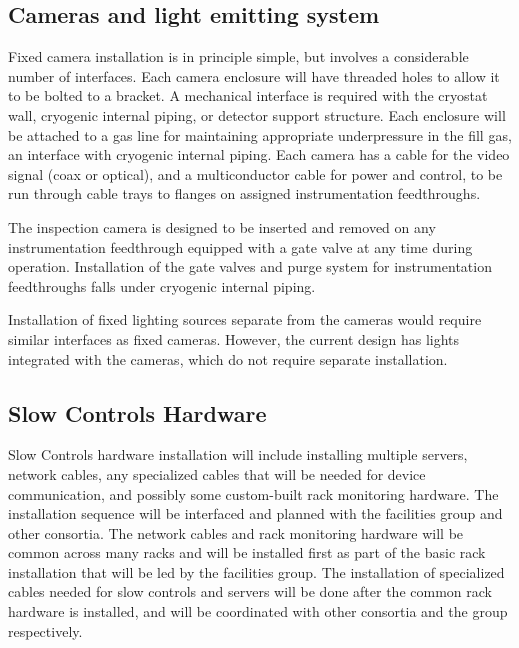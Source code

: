 \subsection{Cameras and light emitting system}
\label{sec:fdgen-slow-cryo-install-c}

Fixed camera installation is in principle simple, but involves a
considerable number of interfaces. Each camera enclosure will have
threaded holes to allow it to be bolted to a bracket. A mechanical
interface is required with the cryostat wall, cryogenic internal
piping, or detector support structure. Each enclosure will be attached
to a gas line for maintaining appropriate underpressure in the fill
gas, an interface with cryogenic internal piping. Each camera has a
cable for the video signal (coax or optical), and a multiconductor
cable for power and control, to be run through cable trays to flanges
on assigned instrumentation feedthroughs.

The inspection camera is designed to be inserted and removed on any
instrumentation feedthrough equipped with a gate valve at any time
during operation.  Installation of the gate valves and purge system
for instrumentation feedthroughs falls under cryogenic internal
piping.

Installation of fixed lighting sources separate from the cameras would
require similar interfaces as fixed cameras.  However, the current
design has lights integrated with the cameras, which do not require separate
installation.



\subsection{Slow Controls Hardware}
\label{sec:fdgen-slow-cryo-install-sc-hard}

Slow Controls hardware installation will include installing multiple
servers, network cables, any specialized cables that will be needed
for device communication, and possibly some custom-built rack
monitoring hardware. The installation sequence will be interfaced and
planned with the facilities group and other consortia. The network
cables and rack monitoring hardware will be common across many racks
and will be installed first as part of the basic rack installation
that will be led by the facilities group. The installation of
specialized cables needed for slow controls and servers will be done
after the common rack hardware is installed, and will be coordinated
with other consortia and the  group respectively.

